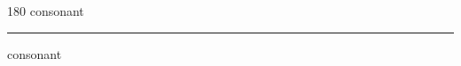 
\begin{frame}
\begin{center}
\begin{turn}{180}
{\fontsize{2.5cm}{1em}\selectfont consonant}
\end{turn}
\vspace{1em}\par  
\hrule
\vspace{1em}\par  
{\fontsize{2.5cm}{1em}\selectfont consonant}
\end{center}
\end{frame}
